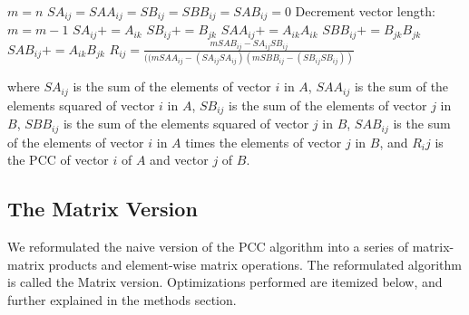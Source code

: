 \documentclass{bioinfo}
\begin{document}
\begin{algorithmic}[1]
    \STATE $m=n$
    \STATE $SA_{ij}=SAA_{ij}=SB_{ij}=SBB_{ij}=SAB_{ij}=0$
        \STATE Decrement vector length: $m=m-1$
      \ELSE
        \STATE $SA_{ij}+=A_{ik}$
        \STATE $SB_{ij}+=B_{jk}$
        \STATE $SAA_{ij}+=A_{ik}A_{ik}$
        \STATE $SBB_{ij}+=B_{jk}B_{jk}$
        \STATE $SAB_{ij}+=A_{ik}B_{jk}$
      \ENDIF
    \ENDFOR 
    \STATE $R_{ij}=\frac{mSAB_{ij}-SA_{ij}SB_{ij}}{((mSAA_{ij}-(SA_{ij}SA_{ij})(mSBB_{ij}-(SB_{ij}SB_{ij}))}$
  \ENDFOR
\ENDFOR
\end{algorithmic}

\vspace{2mm}

\noindent where $SA_{ij}$ is the sum of the elements of vector $i$ in $A$, 
$SAA_{ij}$ is the sum of the elements squared of vector $i$ in $A$, 
$SB_{ij}$ is the sum of the elements of vector $j$ in $B$, 
$SBB_{ij}$ is the sum of the elements squared of vector $j$ in $B$, 
$SAB_{ij}$ is the sum of the elements of vector $i$ in $A$ times the  elements of vector $j$ in $B$, 
and $R_ij$ is the PCC of vector $i$ of $A$ and vector $j$ of $B$.

\subsection{The Matrix Version}
We reformulated the naive version of the PCC algorithm into a series of 
matrix-matrix products and element-wise matrix operations. The 
reformulated algorithm is called the Matrix version. Optimizations 
performed are itemized below, and further explained in the methods section.
\vspace{2mm}
\end{document}
